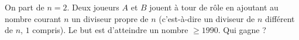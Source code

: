 On part de $n = 2$. Deux joueurs $A$ et $B$ jouent à tour de rôle en ajoutant au nombre courant $n$ un diviseur propre de $n$ (c'est-à-dire un diviseur de $n$ différent de $n$, $1$ compris). Le but est d'atteindre un nombre $\geq 1990$. Qui gagne ?

